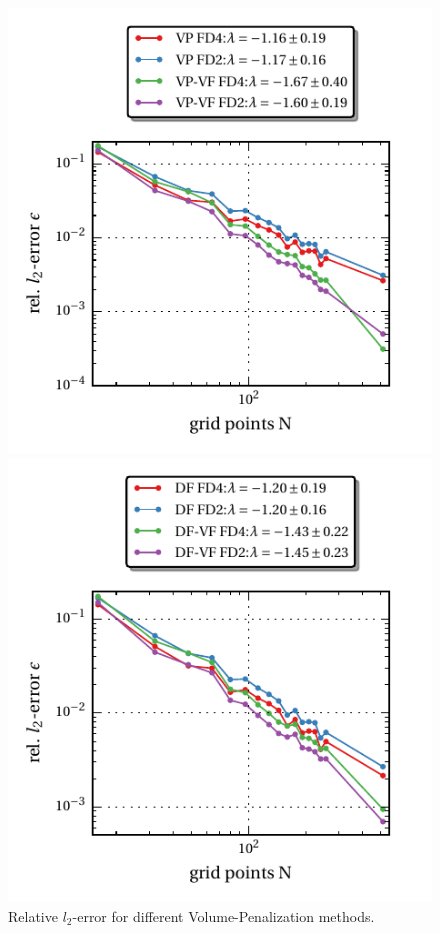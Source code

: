 \begin{figure}[!bp]
  \begin{minipage}[c]{0.45\textwidth}
      \includegraphics{gfx/immersed_boundary/hpflow/theo/vp.pdf}
      \caption{\label{vali:hp_flow_gc_vp}
          Relative $l_2$-error for different Volume-Penalization methods.}
  \end{minipage}
  \hfill
  \begin{minipage}[c]{0.45\textwidth}
      \includegraphics{gfx/immersed_boundary/hpflow/theo/df.pdf}

\end{minipage}
\end{figure}
